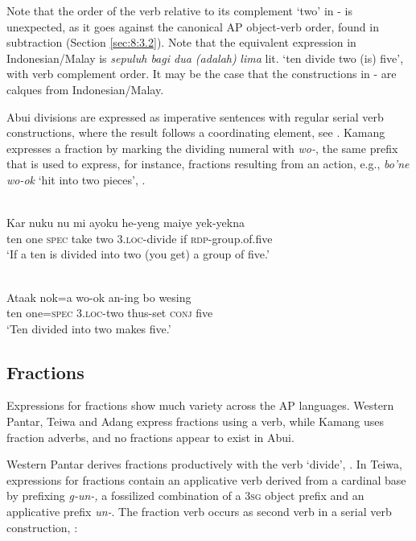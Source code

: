 \documentclass[output=paper]{LSP/langsci}
\begin{document}
 

 

  

Note that the order of the verb relative to its complement `two' in - is unexpected, as it goes against the canonical AP object-verb order, found in subtraction (Section \ref{sec:8:3.2}). Note that the equivalent expression in Indonesian/Malay is \textit{sepuluh bagi dua (adalah)} \textit{lima} lit. `ten divide two (is) five', with verb complement order. It may be the case that the constructions in - are calques from Indonesian/Malay. 

Abui divisions are expressed as imperative sentences with regular serial verb constructions, where the result follows a coordinating element, see . Kamang expresses a fraction by marking the dividing numeral with \textit{wo-}, the same prefix that is used to express, for instance, fractions resulting from an action, e.g., \textit{bo'ne wo-ok} `hit into two pieces', . 


\ea%
\label{bkm:Ref358116296}
\\
\gll  Kar  nuku  nu  mi  ayoku  he-yeng  maiye  yek-yekna \\  
    ten  one  \textsc{spec}  take  two  3.\textsc{loc-}divide  if  \textsc{rdp-}group.of.five \\
\glt  `If a ten is divided into two (you get) a group of five.'
\z



 




\ea
\label{ex:8:1247}
\\
 \gll Ataak  nok=a  wo-ok  an-ing  bo  wesing \\
  ten  one=\textsc{spec}  \textsc{3.loc}-two  thus-set  \textsc{conj}  five \\
 \glt`Ten divided into two makes five.'
\z


\subsection{Fractions}
\label{sec:8:Fractions}
Expressions for fractions show much variety across the AP languages. Western Pantar, Teiwa and Adang express fractions using a verb, while Kamang uses fraction adverbs, and no fractions appear to exist in Abui. 

Western Pantar derives fractions productively with the verb `divide', . In Teiwa, expressions for fractions contain an applicative verb derived from a cardinal base by prefixing \textit{g-un-,} a fossilized combination of a 3\textsc{sg} object prefix and an applicative prefix \textit{un-}. The fraction verb occurs as second verb in a serial verb construction, : 
\end{document}
